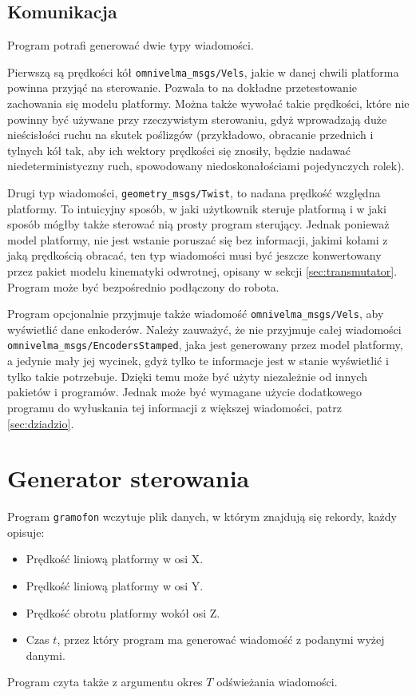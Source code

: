 	\subsection{Komunikacja}
		Program potrafi generować dwie typy wiadomości.
		
		Pierwszą są prędkości kół \texttt{omnivelma\_msgs/Vels}, jakie w danej chwili platforma powinna przyjąć na sterowanie.
		Pozwala to na dokładne przetestowanie zachowania się modelu platformy.
		Można także wywołać takie prędkości, które nie powinny być używane przy rzeczywistym sterowaniu, gdyż wprowadzają duże nieścisłości ruchu na skutek poślizgów
		(przykładowo, obracanie przednich i tylnych kół tak, aby ich wektory prędkości się znosiły, będzie nadawać niedeterministyczny ruch, spowodowany niedoskonałościami
		pojedynczych rolek).
		
		Drugi typ wiadomości, \texttt{geometry\_msgs/Twist}, to nadana prędkość względna platformy.
		To intuicyjny sposób, w jaki użytkownik steruje platformą i w jaki sposób mógłby także sterować nią prosty program sterujący.
		Jednak ponieważ model platformy, nie jest wstanie poruszać się bez informacji, jakimi kołami z jaką prędkością obracać,
		ten typ wiadomości musi być jeszcze konwertowany przez pakiet modelu kinematyki odwrotnej, opisany w sekcji \ref{sec:transmutator}.
		Program może być bezpośrednio podłączony do robota.
		
		Program opcjonalnie przyjmuje także wiadomość \texttt{omnivelma\_msgs/Vels}, aby wyświetlić dane enkoderów.
		Należy zauważyć, że nie przyjmuje całej wiadomości \texttt{omnivelma\_msgs/EncodersStamped}, jaka jest generowany przez model platformy,
		a jedynie mały jej wycinek, gdyż tylko te informacje jest w stanie wyświetlić i tylko takie potrzebuje.
		Dzięki temu może być użyty niezależnie od innych pakietów i programów. Jednak może być wymagane użycie dodatkowego programu do 
		wyłuskania tej informacji z większej wiadomości,
		patrz \ref{sec:dziadzio}.
		
	
\section{Generator sterowania}
	Program \texttt{gramofon} wczytuje plik danych, w którym znajdują się rekordy, każdy opisuje:
	\begin{itemize}
		\item Prędkość liniową platformy w osi X.
		\item Prędkość liniową platformy w osi Y.
		\item Prędkość obrotu platformy wokół osi Z.
		\item Czas $t$, przez który program ma generować wiadomość z podanymi wyżej danymi.
	\end{itemize}
	Program czyta także z argumentu okres $T$ odświeżania wiadomości.
	
